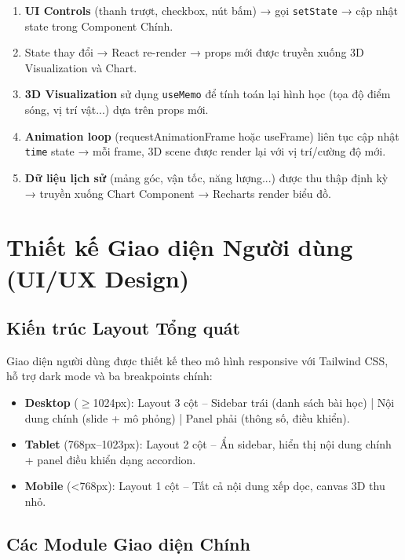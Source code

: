 \begin{enumerate}
    \item \textbf{UI Controls} (thanh trượt, checkbox, nút bấm) → gọi \texttt{setState} → cập nhật state trong Component Chính.
    \item State thay đổi → React re-render → props mới được truyền xuống 3D Visualization và Chart.
    \item \textbf{3D Visualization} sử dụng \texttt{useMemo} để tính toán lại hình học (tọa độ điểm sóng, vị trí vật...) dựa trên props mới.
    \item \textbf{Animation loop} (requestAnimationFrame hoặc useFrame) liên tục cập nhật \texttt{time} state → mỗi frame, 3D scene được render lại với vị trí/cường độ mới.
    \item \textbf{Dữ liệu lịch sử} (mảng góc, vận tốc, năng lượng...) được thu thập định kỳ → truyền xuống Chart Component → Recharts render biểu đồ.
\end{enumerate}


\section{Thiết kế Giao diện Người dùng (UI/UX Design)}

\subsection{Kiến trúc Layout Tổng quát}

Giao diện người dùng được thiết kế theo mô hình responsive với Tailwind CSS, hỗ trợ dark mode và ba breakpoints chính:

\begin{itemize}
    \item \textbf{Desktop} ($\geq$1024px): Layout 3 cột – Sidebar trái (danh sách bài học) | Nội dung chính (slide + mô phỏng) | Panel phải (thông số, điều khiển).
    \item \textbf{Tablet} (768px–1023px): Layout 2 cột – Ẩn sidebar, hiển thị nội dung chính + panel điều khiển dạng accordion.
    \item \textbf{Mobile} (<768px): Layout 1 cột – Tất cả nội dung xếp dọc, canvas 3D thu nhỏ.
\end{itemize}

\subsection{Các Module Giao diện Chính}

